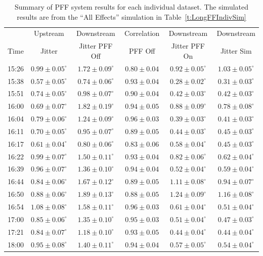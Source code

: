 \begin{table}
  \begin{center}
    \begin{tabular}{| c  c  c  c  c  c  |}
	   \hline
	           & Upstream  & Downstream & Correlation  & Downstream  & Downstream  \\
       Time & Jitter &  Jitter PFF Off &  PFF Off &  Jitter PFF On &  Jitter Sim \\ \hline
15:26 & \(0.99\pm0.05^\circ\) & \(1.72\pm0.09^\circ\) & \(0.80\pm0.04\) & \(0.92\pm0.05^\circ\) & \(1.03\pm0.05^\circ\) \\
15:38 & \(0.57\pm0.05^\circ\) & \(0.74\pm0.06^\circ\) & \(0.93\pm0.04\) & \(0.28\pm0.02^\circ\) & \(0.31\pm0.03^\circ\) \\
15:51 & \(0.74\pm0.05^\circ\) & \(0.98\pm0.07^\circ\) & \(0.90\pm0.04\) & \(0.42\pm0.03^\circ\) & \(0.42\pm0.03^\circ\) \\
16:00 & \(0.69\pm0.07^\circ\) & \(1.82\pm0.19^\circ\) & \(0.94\pm0.05\) & \(0.88\pm0.09^\circ\) & \(0.78\pm0.08^\circ\) \\
16:04 & \(0.79\pm0.06^\circ\) & \(1.24\pm0.09^\circ\) & \(0.96\pm0.03\) & \(0.39\pm0.03^\circ\) & \(0.41\pm0.03^\circ\) \\
16:11 & \(0.70\pm0.05^\circ\) & \(0.95\pm0.07^\circ\) & \(0.89\pm0.05\) & \(0.44\pm0.03^\circ\) & \(0.45\pm0.03^\circ\) \\
16:17 & \(0.61\pm0.04^\circ\) & \(0.80\pm0.06^\circ\) & \(0.83\pm0.06\) & \(0.58\pm0.04^\circ\) & \(0.45\pm0.03^\circ\) \\
16:22 & \(0.99\pm0.07^\circ\) & \(1.50\pm0.11^\circ\) & \(0.93\pm0.04\) & \(0.82\pm0.06^\circ\) & \(0.62\pm0.04^\circ\) \\
16:39 & \(0.96\pm0.07^\circ\) & \(1.36\pm0.10^\circ\) & \(0.94\pm0.04\) & \(0.52\pm0.04^\circ\) & \(0.59\pm0.04^\circ\) \\
16:44 & \(0.84\pm0.06^\circ\) & \(1.67\pm0.12^\circ\) & \(0.89\pm0.05\) & \(1.11\pm0.08^\circ\) & \(0.94\pm0.07^\circ\) \\
16:50 & \(0.88\pm0.06^\circ\) & \(1.89\pm0.13^\circ\) & \(0.88\pm0.05\) & \(1.24\pm0.09^\circ\) & \(1.16\pm0.08^\circ\) \\
16:54 & \(1.08\pm0.08^\circ\) & \(1.58\pm0.11^\circ\) & \(0.96\pm0.03\) & \(0.61\pm0.04^\circ\) & \(0.51\pm0.04^\circ\) \\
17:00 & \(0.85\pm0.06^\circ\) & \(1.35\pm0.10^\circ\) & \(0.95\pm0.03\) & \(0.51\pm0.04^\circ\) & \(0.47\pm0.03^\circ\) \\
17:21 & \(0.84\pm0.07^\circ\) & \(1.18\pm0.10^\circ\) & \(0.93\pm0.05\) & \(0.44\pm0.04^\circ\) & \(0.44\pm0.04^\circ\) \\
18:00 & \(0.95\pm0.08^\circ\) & \(1.40\pm0.11^\circ\) & \(0.94\pm0.04\) & \(0.57\pm0.05^\circ\) & \(0.54\pm0.04^\circ\) \\ \hline
    \end{tabular}
    \caption{Summary of PFF system results for each individual dataset. The simulated results are from the ``All Effects'' simulation in Table~\ref{t:LongFFIndivSim}}
  	\label{t:LongFFIndiv}
  \end{center}
\end{table}

